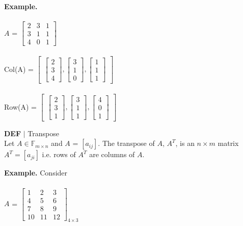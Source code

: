\documentclass [12pt]{article}
\begin{document}
\noindent\textbf{Example.}\\\\
$A$ = $\begin{bmatrix}
2&3&1\\
3&1&1\\
4&0&1
\end{bmatrix}$\\\\
Col(A) = $\begin{bmatrix}
\begin{bmatrix}
2\\
3\\
4
\end{bmatrix}
,
\begin{bmatrix}
3\\
1\\
0
\end{bmatrix}
,
\begin{bmatrix}
1\\
1\\
1
\end{bmatrix}
\end{bmatrix}$\\\\
Row(A) = $\begin{bmatrix}
\begin{bmatrix}
2\\
3\\
1
\end{bmatrix}
,
\begin{bmatrix}
3\\
1\\
1
\end{bmatrix}
,
\begin{bmatrix}
4\\
0\\
1
\end{bmatrix}
\end{bmatrix}$\\
\begin{framed}
\noindent\textbf{DEF} $|$ Transpose\\
Let $A\in\mathbb{F}_{m\times n}$ and $A$ = $[a_{ij}]$. The transpose of $A$, $A^T$, is an $n\times m$ matrix $A^T=[a_{ji}]$ i.e. rows of $A^T$ are columns of $A$.
\end{framed}
\noindent\textbf{Example. } Consider\\\\
$A$ = 
$\begin{bmatrix}
1&2&3\\
4&5&6\\
7&8&9\\
10&11&12
\end{bmatrix}_{4\times3}$\indent
\end{document}
